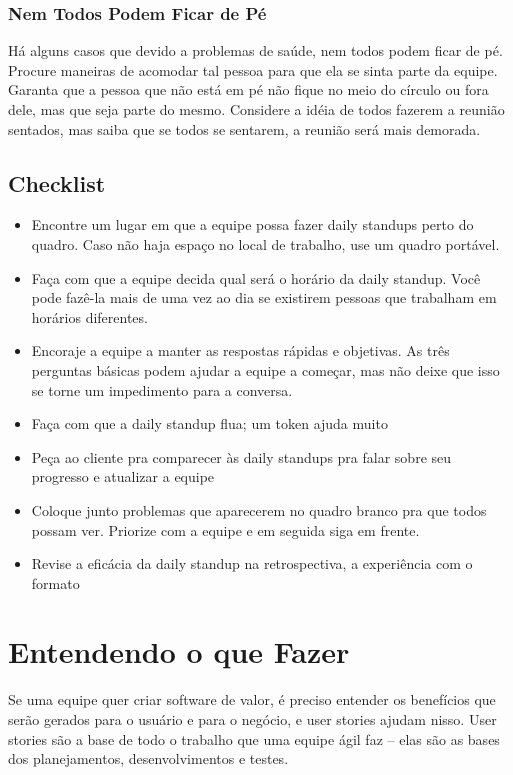 \documentclass[a4paper, 10pt, font=plain]{abnt}
\begin{document}
\subsection{Nem Todos Podem Ficar de Pé}
Há alguns casos que devido a problemas de saúde, nem todos podem ficar de pé. Procure maneiras de acomodar tal pessoa para que ela se sinta parte da equipe. Garanta que a pessoa que não está em pé não fique no meio do círculo ou fora dele, mas que seja parte do mesmo. Considere a idéia de todos fazerem a reunião sentados, mas saiba que se todos se sentarem, a reunião será mais demorada.


\section{Checklist}

\begin{itemize}
\item Encontre um lugar em que a equipe possa fazer daily standups perto do quadro. Caso não haja espaço no local de trabalho, use um quadro portável.

\item Faça com que a equipe decida qual será o horário da daily standup. Você pode fazê-la mais de uma vez ao dia se existirem pessoas que trabalham em horários diferentes.

\item Encoraje a equipe a manter as respostas rápidas e objetivas. As três perguntas básicas podem ajudar a equipe a começar, mas não deixe que isso se torne um impedimento para a conversa.

\item Faça com que a daily standup flua; um token ajuda muito

\item Peça ao cliente pra comparecer às daily standups pra falar sobre seu progresso e atualizar a equipe

\item Coloque junto problemas que aparecerem no quadro branco pra que todos possam ver. Priorize com a equipe e em seguida siga em frente.

\item Revise a eficácia da daily standup na retrospectiva, a experiência com o formato

\end{itemize}



\chapter{Entendendo o que Fazer}
Se uma equipe quer criar software de valor, é preciso entender os benefícios que serão gerados para o usuário e para o negócio, e user stories ajudam nisso. User stories são a base de todo o trabalho que uma equipe ágil faz -- elas são as bases dos planejamentos, desenvolvimentos e testes.
\end{document}

